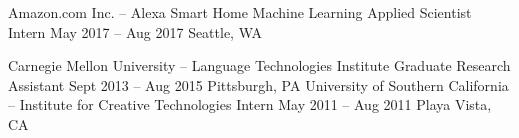 \begin{cventries}
  \cventry
    {Amazon.com Inc. -- Alexa Smart Home Machine Learning} %
    {Applied Scientist Intern} %
    {May 2017 – Aug 2017} %
    {Seattle, WA} %
    {
    }

  \cventry
   {Carnegie Mellon University -- Language Technologies Institute} %
    {Graduate Research Assistant} %
    {Sept 2013 – Aug 2015} %
    {Pittsburgh, PA} %
    {
    }
  \cventry
   {University of Southern California -- Institute for Creative Technologies} %
    {Intern} %
    {May 2011 – Aug 2011} %
    {Playa Vista, CA} %
    {
    }

\end{cventries}

